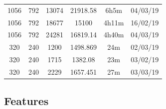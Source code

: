 \documentclass[11pt,a4paper]{report}
\begin{document}
\begin{itemize}
\begin{center}
\begin{tabular}{ c c c | c c c }
  1056 & 792 & 13074 & 21918.58 & 6h5m & 04/03/19 \\
  1056 & 792 & 18677 & 15100 & 4h11m & 16/02/19 \\
  1056 & 792 & 24281 & 16819.14 & 4h40m & 04/03/19 \\
  320 & 240 & 1200 & 1498.869 & 24m & 02/03/19 \\
  320 & 240 & 1715 & 1382.08 & 23m & 03/02/19 \\
  320 & 240 & 2229 & 1657.451 & 27m & 03/03/19 \\
  \end{tabular}
  \end{center}
\end{itemize}

\newpage
\subsection{Features}
\end{document}
